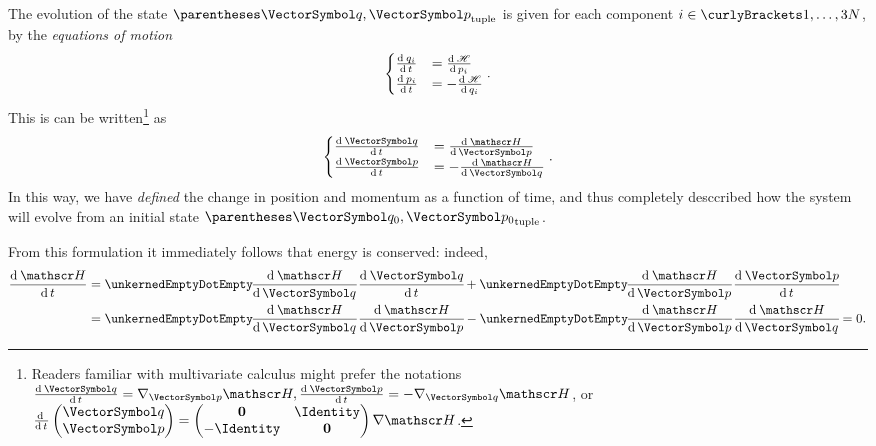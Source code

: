 \documentclass[10pt, a4paper, twoside]{basestyle}
\begin{document}
The evolution of the state $\tuple{\vq, \vp}$ is given for each component $i\in
\set{1,\dotsc,3N}$, by the \emph{equations of motion}
\[
\begin{cases}
\deriv t {q_i} &= \deriv {p_i} \Hamiltonian \\
\deriv t {p_i} &= -\deriv {q_i} \Hamiltonian
\end{cases}.
\]
This is can be written\footnote{Readers familiar with multivariate calculus
might prefer the notations $\deriv t {\vq} = \grad_{\vp} \Hamiltonian,
\deriv t {\vp} = -\grad_{\vq} \Hamiltonian$, or $\derivop t 
\begin{pmatrix}
\vq \\
\vp
\end{pmatrix} =
\begin{pmatrix}
\nullmat    & \Identity \\
-\Identity & \nullmat
\end{pmatrix}
\grad \Hamiltonian$.}
as
\[
\begin{cases}
\deriv t {\vq} &= \deriv {\vp} \Hamiltonian \\
\deriv t {\vp} &= -\deriv {\vq} \Hamiltonian
\end{cases}.
\]
In this way, we have \emph{defined} the change in position and momentum as a
function of time, and thus completely desccribed how the system will evolve from
an initial state $\tuple{\vq_0, \vp_0}$.

From this formulation it immediately follows that energy is conserved:
indeed,
\begin{align*}
\deriv t \Hamiltonian &= \scal{\deriv \vq \Hamiltonian}{\deriv t \vq}
    + \scal{\deriv \vp \Hamiltonian}{\deriv t \vp} \\
&= \scal{\deriv \vq \Hamiltonian}{\deriv \vp \Hamiltonian}
    - \scal{\deriv \vp \Hamiltonian}{\deriv \vq \Hamiltonian} = 0.
\end{align*}
\end{document}
